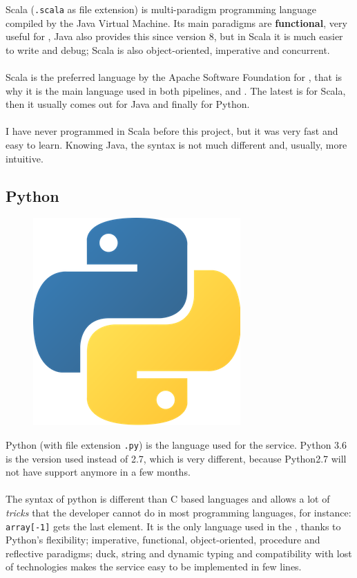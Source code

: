 Scala (\texttt{.scala} as file extension) is multi-paradigm programming language compiled by the Java Virtual Machine\cite{jvm}. Its main paradigms are \textbf{functional}, very useful for , Java\cite{java} also provides this since version 8, but in Scala it is much easier to write and debug; Scala is also object-oriented, imperative and concurrent.
\\\\
Scala is the preferred language by the Apache Software Foundation for , that is why it is the main language used in both pipelines,  and . The latest  is for Scala, then it usually comes out for Java and finally for Python.
\\\\
I have never programmed in Scala before this project, but it was very fast and easy to learn. Knowing Java, the syntax is not much different and, usually, more intuitive.

\subsection*{Python\cite{python}}

\begin{figure}[H]
\includegraphics[scale=0.1]{resources/python-logo.png}
\end{figure}

Python (with file extension \texttt{.py}) is the language used for the service. Python 3.6 is the version used instead of 2.7, which is very different, because Python2.7 will not have support anymore in a few months.
\\\\
The syntax of python is different than C based languages and allows a lot of \textit{tricks} that the developer cannot do in most programming languages, for instance: \texttt{array[-1]} gets the last element. It is the only language used in the , thanks to Python's flexibility; imperative, functional, object-oriented, procedure and reflective paradigms; duck, string and dynamic typing and compatibility with lost of technologies makes the service easy to be implemented in few lines.

